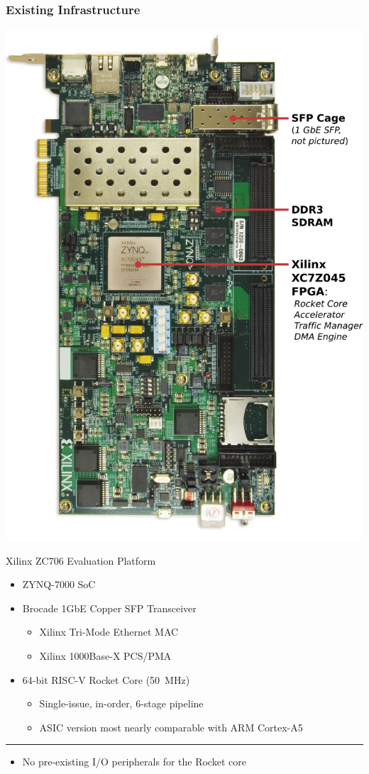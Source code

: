 \frametitle{Existing Infrastructure}

\begin{minipage}{0.4\linewidth}
\includegraphics[width=\linewidth]{../img/zc706.pdf}
\end{minipage}
\hfill
\begin{minipage}{0.55\linewidth}
\alert{Xilinx ZC706 Evaluation Platform}
\begin{itemize}
\item ZYNQ-7000 SoC
\item Brocade 1GbE Copper SFP Transceiver
	\begin{itemize}
	\footnotesize
        \item Xilinx Tri-Mode Ethernet MAC
        \item Xilinx 1000Base-X PCS/PMA
	\end{itemize}
\item 64-bit RISC-V Rocket Core (\SI{50}{\mega\hertz})
	\begin{itemize}
	\footnotesize
	\item Single-issue, in-order, 6-stage pipeline
	\item ASIC version most nearly comparable with ARM Cortex-A5
	\end{itemize}
\end{itemize}
\end{minipage}

\hrule
\vspace{0.5\baselineskip}
\begin{itemize}
\item No pre-existing I/O peripherals for the Rocket core
\end{itemize}
 




